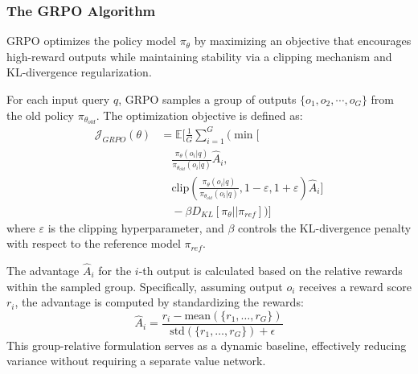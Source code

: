 \subsubsection*{The GRPO Algorithm}
GRPO optimizes the policy model $\pi_\theta$ by maximizing an objective that encourages high-reward outputs while maintaining stability via a clipping mechanism and KL-divergence regularization.

For each input query $q$, GRPO samples a group of outputs $\{o_1, o_2, \cdots, o_G\}$ from the old policy $\pi_{\theta_{old}}$. The optimization objective is defined as:
\begin{equation}
\begin{aligned}
\mathcal{J}_{GRPO}(\theta) &= \mathbb{E}\Bigg[ \frac{1}{G} \sum_{i=1}^{G} \Bigg( \min \Bigg[ \\
&\quad \frac{\pi_\theta(o_i|q)}{\pi_{\theta_{old}}(o_i|q)} \hat{A}_i, \\
&\quad \text{clip}\left( \frac{\pi_\theta(o_i|q)}{\pi_{\theta_{old}}(o_i|q)}, 1-\varepsilon, 1+\varepsilon \right) \hat{A}_i \Bigg] \\
&\quad - \beta D_{KL}[\pi_\theta || \pi_{ref}] \Bigg) \Bigg]
\end{aligned}
\end{equation}
where $\varepsilon$ is the clipping hyperparameter, and $\beta$ controls the KL-divergence penalty with respect to the reference model $\pi_{ref}$.

The advantage $\hat{A}_i$ for the $i$-th output is calculated based on the relative rewards within the sampled group. Specifically, assuming output $o_i$ receives a reward score $r_i$, the advantage is computed by standardizing the rewards:
\begin{equation}
\hat{A}_i = \frac{r_i - \text{mean}(\{r_1, \dots, r_G\})}{\text{std}(\{r_1, \dots, r_G\}) + \epsilon}
\end{equation}
This group-relative formulation serves as a dynamic baseline, effectively reducing variance without requiring a separate value network.


